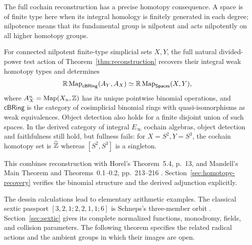The full cochain reconstruction has a precise homotopy consequence.
A space is of finite type here when its integral homology is finitely
generated in each degree; nilpotence means that its fundamental group
is nilpotent and acts nilpotently on all higher homotopy groups.

\begin{corollary}
\label{cor:homotopy-recovery}
For connected nilpotent finite-type simplicial sets $X,Y$, the full
natural divided-power test action of Theorem~\ref{thm:reconstruction}
recovers their integral weak homotopy types and determines
\[
 \mathbb R\operatorname{Map}_{\mathsf{cBRing}}(A_Y,A_X)
 \simeq\mathbb R\operatorname{Map}_{\mathsf{Spaces}}(X,Y),
\]
where $A_X^n=\operatorname{Map}(X_n,\mathbb Z)$ has its unique pointwise
binomial operations, and $\mathsf{cBRing}$ is the category of
cosimplicial binomial rings with quasi-isomorphisms as weak
equivalences. Object detection also holds for a finite disjoint union
of such spaces. In the derived category of integral $E_\infty$
cochain algebras, object detection and faithfulness still hold, but
fullness fails: for $X=S^2,Y=S^3$, the cochain homotopy set is
$\widehat{\mathbb Z}$ whereas $[S^2,S^3]$ is a singleton.
\end{corollary}
This combines reconstruction with Horel's Theorem~5.4, p.~13, and
Mandell's Main Theorem and Theorems~0.1--0.2, pp.~213--216
\cite{Horel,Mandell}. Section~\ref{sec:homotopy-recovery} verifies
the binomial structure and the derived adjunction explicitly.

The dessin calculations lead to elementary arithmetic examples.
The classical sextic passport $[3,2,1;2,2,1,1;6]$ is Schneps's
three-member orbit \cite[Section~IV, Example~3, pp.~27--28]{Schneps}.
Section~\ref{sec:sextic} gives its complete normalized functions,
monodromy, fields, and collision parameters. The following theorem
specifies the related radical actions and the ambient groups in
which their images are open.

